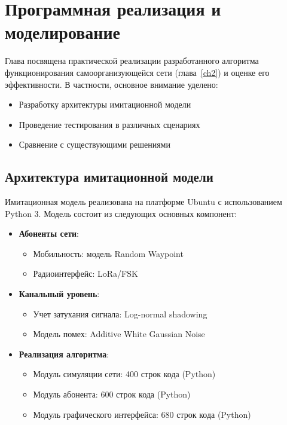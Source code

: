 \chapter{Программная реализация и моделирование} \label{ch3}

Глава посвящена практической реализации разработанного алгоритма функционирования самоорганизующейся сети (глава~\ref{ch2}) и оценке 
его эффективности. В частности, основное внимание уделено:

\begin{itemize}
    \item Разработку архитектуры имитационной модели
    \item Проведение тестирования в различных сценариях
    \item Сравнение с существующими решениями
\end{itemize}

\section{Архитектура имитационной модели} \label{ch3:sec1}

Имитационная модель реализована на платформе Ubuntu с использованием Python 3. Модель состоит из следующих основных компонент:

\begin{itemize}
    \item \textbf{Абоненты сети}:
    \begin{itemize}
        \item Мобильность: модель Random Waypoint
        \item Радиоинтерфейс: LoRa/FSK
    \end{itemize}
    
    \item \textbf{Канальный уровень}:
    \begin{itemize}
        \item Учет затухания сигнала: Log-normal shadowing
        \item Модель помех: Additive White Gaussian Noise
    \end{itemize}
    
    \item \textbf{Реализация алгоритма}:
    \begin{itemize}
        \item Модуль симуляции сети: 400 строк кода (Python)
        \item Модуль абонента: 600 строк кода (Python)
        \item Модуль графического интерфейса: 680 строк кода (Python)
    \end{itemize}
\end{itemize}

